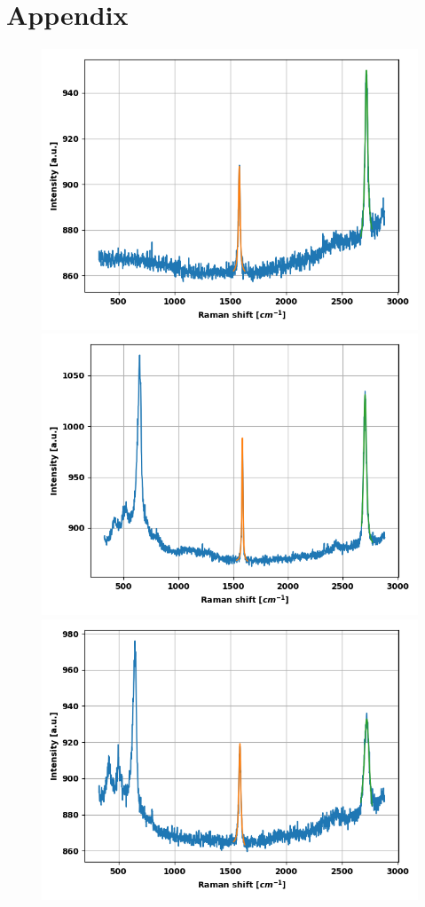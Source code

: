 \documentclass[12pt,a4paper]{article}
\begin{document}
\section{Appendix}
\begin{figure}
\centering
\includegraphics[scale=0.5]{Bilder/part6/1.png}
\includegraphics[scale=0.5]{Bilder/part6/2.png}
\includegraphics[scale=0.5]{Bilder/part6/3.png}

\end{figure}
\end{document}
